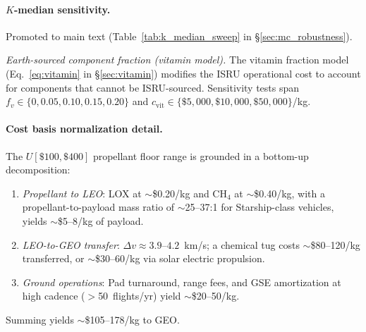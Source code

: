 \documentclass[5p,twocolumn]{elsarticle}
\begin{document}
\paragraph{$K$-median sensitivity.} Promoted to main text (Table~\ref{tab:k_median_sweep} in \S\ref{sec:mc_robustness}).

\emph{Earth-sourced component fraction (vitamin model).} The vitamin fraction model (Eq.~\ref{eq:vitamin} in \S\ref{sec:vitamin}) modifies the ISRU operational cost to account for components that cannot be ISRU-sourced. Sensitivity tests span $f_v \in \{0, 0.05, 0.10, 0.15, 0.20\}$ and $c_{\mathrm{vit}} \in \{\$5{,}000, \$10{,}000, \$50{,}000\}$/kg.

\paragraph{Cost basis normalization detail.} The $U[\$100, \$400]$ propellant floor range is grounded in a bottom-up decomposition:
\begin{enumerate}
  \item \emph{Propellant to LEO}: LOX at $\sim$\$0.20/kg and CH$_4$ at $\sim$\$0.40/kg, with a propellant-to-payload mass ratio of $\sim$25--37:1 for Starship-class vehicles, yields $\sim$\$5--8/kg of payload.
  \item \emph{LEO-to-GEO transfer}: $\Delta v \approx 3.9$--$4.2$~km/s; a chemical tug costs $\sim$\$80--120/kg transferred, or $\sim$\$30--60/kg via solar electric propulsion.
  \item \emph{Ground operations}: Pad turnaround, range fees, and GSE amortization at high cadence ($>$50~flights/yr) yield $\sim$\$20--50/kg.
\end{enumerate}
Summing yields $\sim$\$105--178/kg to GEO.
\end{document}
